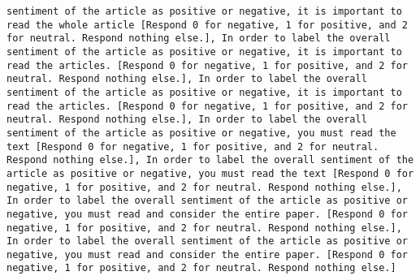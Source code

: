 \begin{lstlisting}[label=lst:poor_performing_prompts]
sentiment of the article as positive or negative, it is important to read the whole article [Respond 0 for negative, 1 for positive, and 2 for neutral. Respond nothing else.], In order to label the overall sentiment of the article as positive or negative, it is important to read the articles. [Respond 0 for negative, 1 for positive, and 2 for neutral. Respond nothing else.], In order to label the overall sentiment of the article as positive or negative, it is important to read the articles. [Respond 0 for negative, 1 for positive, and 2 for neutral. Respond nothing else.], In order to label the overall sentiment of the article as positive or negative, you must read the text [Respond 0 for negative, 1 for positive, and 2 for neutral. Respond nothing else.], In order to label the overall sentiment of the article as positive or negative, you must read the text [Respond 0 for negative, 1 for positive, and 2 for neutral. Respond nothing else.], In order to label the overall sentiment of the article as positive or negative, you must read and consider the entire paper. [Respond 0 for negative, 1 for positive, and 2 for neutral. Respond nothing else.], In order to label the overall sentiment of the article as positive or negative, you must read and consider the entire paper. [Respond 0 for negative, 1 for positive, and 2 for neutral. Respond nothing else.]

\end{lstlisting}
